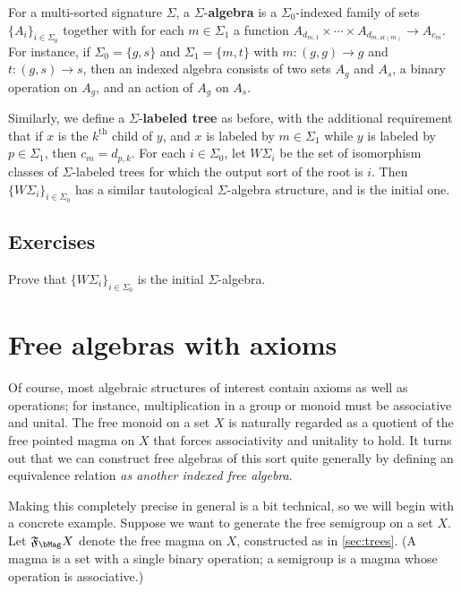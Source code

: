 \documentclass{book}
\def\ay{\mathrm{ar}}
\def\sig{\Sigma}
\newcommand{\F}[1]{\mathfrak{F}_{#1}}
\begin{document}
For a multi-sorted signature $\sig$, a $\sig$-\textbf{algebra} is a $\sig_0$-indexed family of sets $\{A_i\}_{i\in\sig_0}$ together with for each $m\in\sig_1$ a function $A_{d_{m,1}}\times \cdots \times A_{d_{m,\ay(m)}} \to A_{c_m}$.
For instance, if $\sig_0 = \{g,s\}$ and $\sig_1=\{m,t\}$ with
$m : (g,g) \to g$ and $t : (g,s) \to s$,
then an indexed algebra consists of two sets $A_g$ and $A_s$, a binary operation on $A_g$, and an action of $A_g$ on $A_s$.

Similarly, we define a $\sig$-\textbf{labeled tree} as before, with the additional requirement that if $x$ is the $k^{\mathrm{th}}$ child of $y$, and $x$ is labeled by $m\in\sig_1$ while $y$ is labeled by $p\in\sig_1$, then $c_m = d_{p,k}$.
For each $i\in\sig_0$, let $W\sig_i$ be the set of isomorphism classes of $\sig$-labeled trees for which the output sort of the root is $i$.
Then $\{W\sig_i\}_{i\in\sig_0}$ has a similar tautological $\sig$-algebra structure, and is the initial one.

\subsection*{Exercises}

\begin{ex}
  Prove that $\{W\sig_i\}_{i\in\sig_0}$ is the initial $\sig$-algebra.
\end{ex}

\section{Free algebras with axioms}
\label{sec:axioms}

Of course, most algebraic structures of interest contain axioms as well as operations; for instance, multiplication in a group or monoid must be associative and unital.
The free monoid on a set $X$ is naturally regarded as a quotient of the free pointed magma on $X$ that forces associativity and unitality to hold.
It turns out that we can construct free algebras of this sort quite generally by defining an equivalence relation \emph{as another indexed free algebra}.

Making this completely precise in general is a bit technical, so we will begin with a concrete example.
Suppose we want to generate the free semigroup on a set $X$.
Let $\F\bMag X$ denote the free magma on $X$, constructed as in \cref{sec:trees}.
(A magma is a set with a single binary operation; a semigroup is a magma whose operation is associative.)
\end{document}
